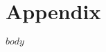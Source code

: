 \hypertarget{appendix}{%
\chapter{Appendix}\label{appendix}}

\begingroup
  \scriptsize
  \setlength{\LTpost}{0pt}

  \renewcommand\subsection{\heading{subsection}{2}{\large}}
  \renewcommand\subsubsection{\heading{subsubsection}{3}{\normalsize}}
  \renewcommand\paragraph{\heading{paragraph}{4}{\normalsize}}
  \renewcommand\subparagraph{\heading{subparagraph}{5}{\normalsize}}

  $body$
\endgroup

\newpage
{}
{}

